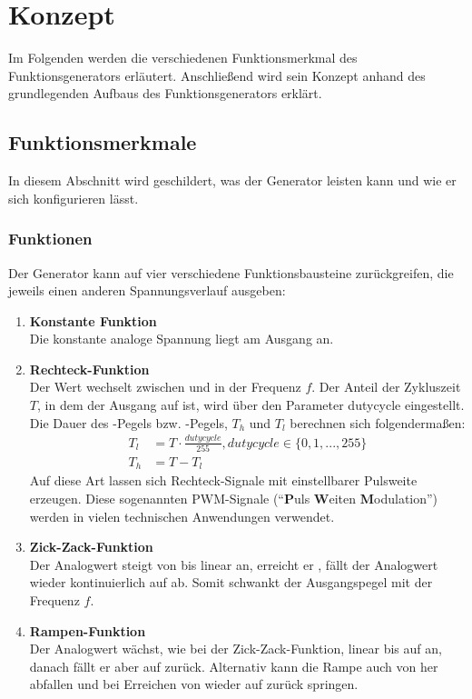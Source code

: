 \chapter{Konzept}
Im Folgenden werden die verschiedenen Funktionsmerkmal des Funktionsgenerators erläutert.
Anschließend wird sein Konzept anhand des grundlegenden Aufbaus des Funktionsgenerators erklärt.
 
\section{Funktionsmerkmale} \label{Concept:Feature}
In diesem Abschnitt wird geschildert, was der Generator leisten kann und wie er sich konfigurieren lässt. 

\subsection{Funktionen} \label{Concept:Feature:Func}
Der Generator kann auf vier verschiedene Funktionsbausteine zurückgreifen, die jeweils einen anderen Spannungsverlauf ausgeben:

\begin{enumerate}
   \item \textbf{Konstante Funktion} \\ 
    Die konstante analoge Spannung  liegt am Ausgang an.
  \item \textbf{Rechteck-Funktion} \\
    Der Wert wechselt zwischen  und  in der Frequenz $f$.
    Der Anteil der Zykluszeit $T$, in dem der Ausgang auf  ist, wird über den Parameter dutycycle eingestellt.
    Die Dauer des -Pegels bzw. -Pegels, $T_{h}$ und $T_{l}$ berechnen sich folgendermaßen:
    \begin{align}
      T_{l} &= T \cdot \frac{dutycycle}{255}, dutycycle \in \{0, 1, ..., 255\} \label{Concept:Feature:Func:eqdc1} \\
      T_{h} &= T - T_{l} \label{Concept:Feature:Func:eqdc2}
    \end{align}
    Auf diese Art lassen sich Rechteck-Signale mit einstellbarer Pulsweite erzeugen.
    Diese sogenannten PWM-Signale (``\textbf{P}uls \textbf{W}eiten \textbf{M}odulation'') werden in vielen technischen Anwendungen verwendet.
  \item \textbf{Zick-Zack-Funktion} \\
    Der Analogwert steigt von  bis  linear an, erreicht er , fällt der Analogwert wieder kontinuierlich auf  ab. Somit schwankt der Ausgangspegel mit der Frequenz $f$.
  \item \textbf{Rampen-Funktion} \\
    Der Analogwert wächst, wie bei der Zick-Zack-Funktion, linear bis auf  an, danach fällt er aber auf  zurück.
    Alternativ kann die Rampe auch von  her abfallen und bei Erreichen von  wieder auf  zurück springen.
\end{enumerate}


